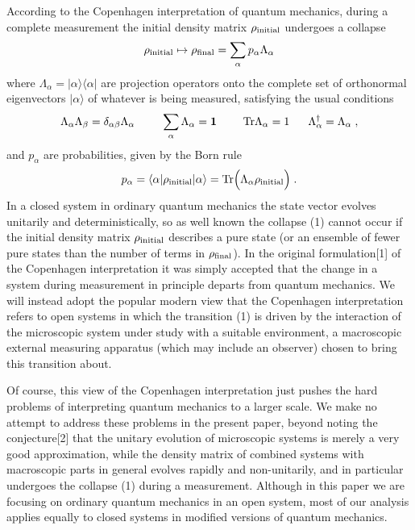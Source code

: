 According to the Copenhagen interpretation of quantum mechanics, during a complete measurement the initial density matrix $\rho_{\rm initial}$ undergoes a collapse 
\begin{equation}
\rho_{\rm initial}\mapsto \rho_{\rm final}=\sum_\alpha p_\alpha\Lambda_\alpha
\end{equation}
where $\Lambda_\alpha=|\alpha\rangle\langle\alpha|$ are projection operators onto the complete set of orthonormal eigenvectors $|\alpha\rangle$  of whatever is being measured, satisfying the usual conditions
\begin{equation}
\Lambda_\alpha\Lambda_\beta=\delta_{\alpha\beta}\Lambda_\alpha~~~~~~~\sum_\alpha\Lambda_\alpha=\mbox{\boldmath{$1$}}~~~~~~~{\rm Tr}\Lambda_\alpha=1~~~~~\Lambda_\alpha^\dagger=\Lambda_\alpha\;,
\end{equation}
and $p_\alpha$ are probabilities, given by the Born rule 
\begin{equation}
p_\alpha=\langle\alpha|\rho_{\rm initial}|\alpha\rangle={\rm Tr}\Big(\Lambda_\alpha \rho_{\rm initial}\Big)\;.
\end{equation}
In a closed system in ordinary quantum mechanics the state vector evolves unitarily and deterministically, so as well known the collapse (1) cannot occur if the initial density matrix $\rho_{\rm initial}$ describes a pure state (or an ensemble of fewer pure states than the number of terms in $\rho_{\rm final}$).  In the original formulation[1] of the Copenhagen interpretation it was simply accepted that the change in a system during measurement in principle  departs from quantum mechanics.  We will instead adopt the popular modern  view that  the Copenhagen interpretation refers to open systems in which the transition (1) is driven by the interaction of the microscopic system under study with a suitable environment, a macroscopic external measuring apparatus (which may include an observer) chosen to bring this transition about.

Of course, this view of the Copenhagen interpretation just pushes  the hard problems of interpreting quantum mechanics to a  larger scale.  We make no attempt to address these problems in the present paper, beyond noting the conjecture[2] that  the unitary evolution of microscopic systems is merely a very good approximation, while the density matrix of combined systems with macroscopic parts in general evolves rapidly  and non-unitarily, and in particular undergoes the collapse (1) during a measurement.   Although in this paper we are focusing on 
ordinary quantum mechanics in an open system,  most of our analysis applies equally to closed systems in modified versions of quantum mechanics.





